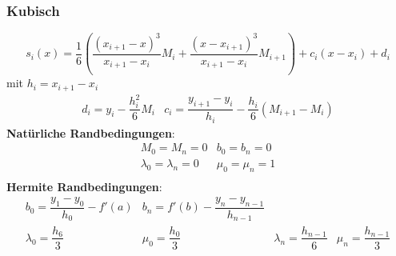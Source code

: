 \documentclass[
	ngerman,
	accentcolor=9c,%
	type=intern,
	marginpar=false
	]{tudapub}
\begin{document}
            \subsubsection{Kubisch}
            \begin{equation*}
                s_i(x) = \dfrac{1}{6} \left(
                    \dfrac{(x_{i+1} - x)^3}{x_{i+1} - x_i}M_i +
                    \dfrac{(x - x_{i+1})^3}{x_{i+1} - x_i}M_{i+1}
                \right)
                + c_i (x-x_i) + d_i
            \end{equation*}
            mit $h_i = x_{i+1} - x_i$
            \begin{equation*}
                \begin{matrix}
                    d_i = y_i - \dfrac{h_i^2}{6}M_i & c_i = \dfrac{y_{i+1} - y_i}{h_i}- \dfrac{h_i}{6}(M_{i+1} - M_i)
                \end{matrix}
            \end{equation*}
            \textbf{Natürliche Randbedingungen}:\\
            \begin{equation*}
                \begin{matrix}
                    M_0 = M_n = 0 & b_0 = b_n = 0\\
                    \lambda_0 = \lambda_n = 0 & \mu_0 = \mu_n = 1\\ 
                \end{matrix}
            \end{equation*}
            \textbf{Hermite Randbedingungen}:\\
            \begin{equation*}
                \begin{matrix}
                    b_0 = \dfrac{y_1-y_0}{h_0} - f'(a) & b_n = f'(b) - \dfrac{y_n - y_{n-1}}{h_{n-1}} & & \\
                    \lambda_0 =\dfrac{h_6}{3} & \mu_0 = \dfrac{h_0}{3} & \lambda_n = \dfrac{h_{n-1}}{6} & \mu_n = \dfrac{h_{n-1}}{3}\\ 
                \end{matrix}
            \end{equation*}
\end{document}
